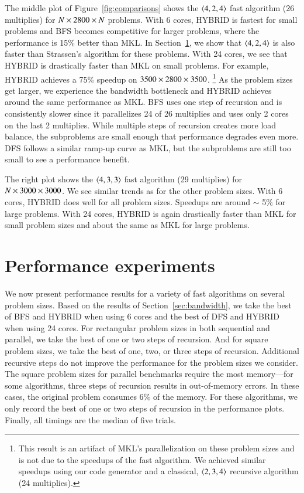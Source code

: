 \documentclass[preprint]{sigplanconf}
\begin{document}
The middle plot of Figure~\ref{fig:comparisons} shows the $\left\langle4, 2, 4\right\rangle$ fast algorithm (26 multiplies) for $N \times 2800 \times N$ problems.
With 6 cores, HYBRID is fastest for small problems and BFS becomes competitive for larger problems,
where the performance is 15\% better than MKL.
In Section~\ref{sec:performance}, we show that $\left\langle4, 2, 4\right\rangle$ is also faster than Strassen's algorithm for these problems.
With 24 cores, we see that HYBRID is drastically faster than MKL on small problems.
For example, HYBRID achieves a 75\% speedup on $3500 \times 2800 \times 3500$. \footnote{
This result is an artifact of MKL's parallelization on these problem sizes and is not due to the speedups of the fast algorithm.
We achieved similar speedups using our code generator and a classical, $\left\langle2, 3, 4\right\rangle$ recursive algorithm (24 multiplies).
}
As the problem sizes get larger, we experience the bandwidth bottleneck and HYBRID achieves around the same performance as MKL.
BFS uses one step of recursion and is consistently slower since it parallelizes 24 of 26 multiplies and uses only 2 cores on the last 2 multiplies.
While multiple steps of recursion creates more load balance, the subproblems are small enough that performance degrades even more.
DFS follows a similar ramp-up curve as MKL, but the subproblems are still too small to see a performance benefit.

The right plot shows the $\left\langle4, 3, 3\right\rangle$ fast algorithm (29 multiplies) for $N \times 3000 \times 3000$.
We see similar trends as for the other problem sizes.
With 6 cores, HYBRID does well for all problem sizes.
Speedups are around $\sim$ 5\% for large problems.
With 24 cores, HYBRID is again drastically faster than MKL for small problem sizes and about the same as MKL for large problems.

\section{Performance experiments}
\label{sec:performance}

We now present performance results for a variety of fast algorithms on several problem sizes.
Based on the results of Section~\ref{sec:bandwidth},
we take the best of BFS and HYBRID when using 6 cores and the best of DFS and HYBRID when using 24 cores.
For rectangular problem sizes in both sequential and parallel, we take the best of one or two steps of recursion.
And for square problem sizes, we take the best of one, two, or three steps of recursion.
Additional recursive steps do not improve the performance for the problem sizes we consider.
The square problem sizes for parallel benchmarks require the most memory---for some algorithms, three steps of recursion results in out-of-memory errors.
In these cases, the original problem consumes 6\% of the memory.
For these algorithms, we only record the best of one or two steps of recursion in the performance plots.
Finally, all timings are the median of five trials.
\end{document}
